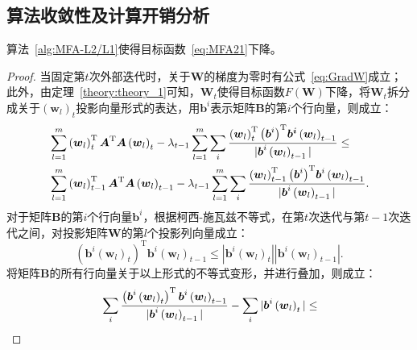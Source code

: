 \subsection{算法收敛性及计算开销分析}
\begin{theorem}
\label{theory:theory_2}
   算法~\ref{alg:MFA-L2/L1}使得目标函数~\eqref{eq:MFA21}下降。 
\end{theorem}
\begin{proof}
当固定第$t$次外部迭代时，关于$\boldsymbol{W}$的梯度为零时有公式~\eqref{eq:GradW}成立；此外，由定理~\ref{theory:theory_1}可知，$\boldsymbol{W}_t$使得目标函数$F\left(\boldsymbol{W}\right)$下降，将$\boldsymbol{W}_t$拆分成关于$\left(\boldsymbol{w}_l\right)_t$投影向量形式的表达，用$\boldsymbol{b}^i$表示矩阵$\boldsymbol{B}$的第$i$个行向量，则成立：
  \begin{align}\label{eq:covg1}
    &\displaystyle \sum_{l=1}^m \left(\boldsymbol{w}_l\right)_{t}^\mathrm{T}\boldsymbol{A}^\mathrm{T}\boldsymbol{A}\left(\boldsymbol{w}_l\right)_{t}-\lambda_{t-1}\displaystyle \sum_{l=1}^m \sum_{i} \frac{\left(\boldsymbol{w}_l\right)_t^\mathrm{T}{\left( \boldsymbol{b}^i\right) }^\mathrm{T}\boldsymbol{b^i}\left(\boldsymbol{w}_l\right)_{t-1}}{|\boldsymbol{b}^i\left(\boldsymbol{w}_l\right)_{t-1}|}\leq \notag\\
    &\displaystyle \sum_{l=1}^m \left(\boldsymbol{w}_l\right)_{t-1}^\mathrm{T}\boldsymbol{A}^\mathrm{T}\boldsymbol{A} \left(\boldsymbol{w}_l \right)_{t-1}-\lambda_{t-1}\displaystyle \sum_{l=1}^m\sum_{i}  \frac{\left(\boldsymbol{w}_l\right)^\mathrm{T}_{t-1}{\left( \boldsymbol{b}^i\right) }^\mathrm{T}\boldsymbol{b}^i\left(\boldsymbol{w}_l\right)_{t-1}}{|\boldsymbol{b}^i\left(\boldsymbol{w}_l\right)_{t-1}|}.
    \end{align}
对于矩阵$\boldsymbol{B}$的第$i$个行向量$\boldsymbol{b}^i$，根据柯西-施瓦兹不等式，在第$t$次迭代与第$t-1$次迭代之间，对投影矩阵$\boldsymbol{W}$的第$l$个投影列向量成立：
  \begin{equation}\label{eq:covg2}
    \left(\boldsymbol{b}^i\left(\boldsymbol{w}_l\right)_t\right)^\mathrm{T}\boldsymbol{b}^i\left(\boldsymbol{w}_l\right)_{t-1}\leq |\boldsymbol{b}^i\left(\boldsymbol{w}_l\right)_t||\boldsymbol{b}^i\left(\boldsymbol{w}_l\right)_{t-1}|.
  \end{equation}  
将矩阵$\boldsymbol{B}$的所有行向量关于以上形式的不等式变形，并进行叠加，则成立：
  \begin{align}\label{eq:covg3}
    &\displaystyle \sum_{i} \frac{\left(\boldsymbol{b}^i\left(\boldsymbol{w}_l\right)_t\right)^\mathrm{T}\boldsymbol{b}^i\left(\boldsymbol{w}_l\right)_{t-1}}{|\boldsymbol{b}^i\left(\boldsymbol{w}_l \right)_{t-1}|}-\displaystyle \sum_{i} |\boldsymbol{b}^i\left(\boldsymbol{w}_l\right)_{t}|\leq \notag\\

\end{align}
\end{proof}

